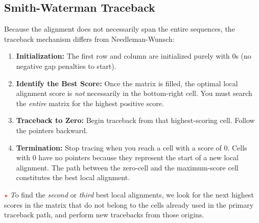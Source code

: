 \documentclass[11pt,a4paper]{article}
\newcommand{\sta}{\textcolor{red}{\textbf{\large $\star$}} \textit}
\begin{document}
\subsection{Smith-Waterman Traceback}
Because the alignment does not necessarily span the entire sequences, the traceback mechanism differs from Needleman-Wunsch:
\begin{enumerate}
    \item \textbf{Initialization:} The first row and column are initialized purely with 0s (no negative gap penalties to start).
    \item \textbf{Identify the Best Score:} Once the matrix is filled, the optimal local alignment score is \textit{not} necessarily in the bottom-right cell. You must search the \textit{entire} matrix for the highest positive score.
    \item \textbf{Traceback to Zero:} Begin traceback from that highest-scoring cell. Follow the pointers backward.
    \item \textbf{Termination:} Stop tracing when you reach a cell with a score of 0. Cells with 0 have no pointers because they represent the start of a new local alignment. The path between the zero-cell and the maximum-score cell constitutes the best local alignment.
\end{enumerate}

\sta To find the \textit{second} or \textit{third} best local alignments, we look for the next highest scores in the matrix that do not belong to the cells already used in the primary traceback path, and perform new tracebacks from those origins.
\end{document}
